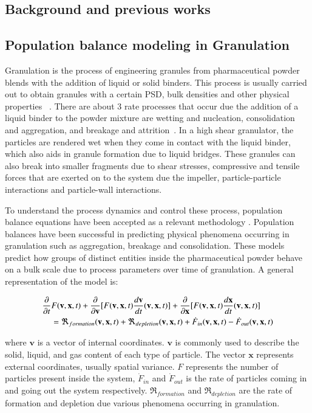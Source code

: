 \documentclass[preprint,10pt,authoryear,review]{elsarticle}
\begin{document}
\begin{linenumbers}
\section{Background and previous works}
\label{secBkgd}
\subsection{Population balance modeling in Granulation}
Granulation is the process of engineering granules from pharmaceutical powder blends 
with the addition of liquid or solid binders. This process is usually carried out 
to obtain granules with a certain PSD,  bulk densities and other physical properties
~\citep{Barrasso2015cerd}.
There are about 3 rate processes that occur due the addition of a liquid binder to the 
powder mixture are wetting and nucleation, consolidation and aggregation, and breakage 
and attrition~\citep{sen2014}. In a high shear granulator, the particles are rendered wet 
when they come in contact with the liquid binder, which also aids in granule formation due to 
liquid bridges. These granules can also break into smaller fragments due to shear stresses, 
compressive and tensile forces that are exerted on to the system due the impeller, 
particle-particle interactions and particle-wall interactions.

To understand the process dynamics and control these process, population balance equations 
have been accepted as a relevant methodology \citep{Immanuel2005}. Population balances have been successful in 
predicting physical phenomena occurring in granulation such as aggregation, breakage and 
consolidation. These models predict how groups of distinct entities inside the pharmaceutical 
powder behave on a bulk scale due to process parameters over time of granulation. A
general representation of the model is:

\begin{align}
\frac{ \partial}{\partial t}&F(\textbf{v},\textbf{x},t) + \frac{\partial}{\partial 
\textbf{v}}[F(\textbf{v},\textbf{x},t)\frac{d\textbf{v}}{dt}(\textbf{v},\textbf{x},t)] 
+ \frac{\partial}{\partial \textbf{x}}[F(\textbf{v},\textbf{x},t)\frac{d\textbf{x}}{dt}
(\textbf{v},\textbf{x},t)] \notag\\
    &= 
\Re_{formation}(\textbf{v},\textbf{x},t)+\Re_{depletion}(\textbf{v},\textbf{x},t)
+\dot{F}_{in}(\textbf{v},\textbf{x},t) -\dot{F}_{out}(\textbf{v},\textbf{x},t) 
\label{eqn:bkgd_pbm_general} 
\end{align}

where $\textbf{v}$ is a vector of internal 
coordinates.  $\textbf{v}$ is commonly used to describe the solid, liquid, 
and gas content of each type of particle. The vector $\textbf{x}$ represents 
external coordinates, usually spatial variance. $F$ represents the 
number of particles present inside the system, $\dot{F}_{in}$ 
and $\dot{F}_{out}$ is the rate of particles coming in and going out the 
system respectively. $\Re_{formation}$ and $\Re_{depletion}$ are the rate of 
formation and depletion due various phenomena occurring in granulation. 


\end{linenumbers}
\end{document}
